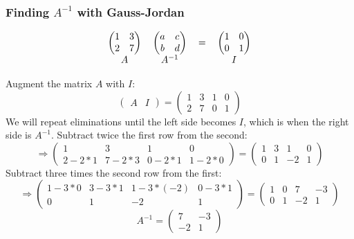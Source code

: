 \documentclass[12pt]{article}
\begin{document}
\subsubsection{Finding $A^{-1}$ with Gauss-Jordan}
\[ 
  \begin{tabular}{cccc}
    $\left(
        \begin{matrix}
            1 & 3\\
            2 & 7
        \end{matrix}
    \right)$ &
    $\left(
        \begin{matrix}
            a & c\\
            b & d
        \end{matrix}
    \right)$ &
    $=$ & 
    $\left(
        \begin{matrix}
            1 & 0\\
            0 & 1
        \end{matrix}
    \right)$\\
    $A$ & $A^{-1}$ & & $I$
  \end{tabular}
\]

Augment the matrix $A$ with $I$:
\[
\left(
    \begin{array}{c|c}
        A & I
    \end{array}
\right)
=
\left(
    \begin{array}{cc|cc}
        1 & 3 & 1 & 0\\ 
        2 & 7 & 0 & 1
    \end{array}
\right)
\]
We will repeat eliminations until the left side becomes $I$, which is when the right side is $A^{-1}$. Subtract twice the first row from the second:
\[
\Rightarrow
\left(
    \begin{array}{cc|cc}
        1 & 3 & 1 & 0\\ 
        2-2*1 & 7-2*3 & 0-2*1 & 1-2*0
    \end{array}
\right)
=
\left(
    \begin{array}{cc|cc}
        1 & 3 & 1 & 0\\ 
        0 & 1 & -2 & 1
    \end{array}
\right)
\]
Subtract three times the second row from the first:
\[
\Rightarrow
\left(
    \begin{array}{cc|cc}
        1-3*0 & 3-3*1 & 1-3*(-2) & 0-3*1\\ 
        0 & 1 & -2 & 1
    \end{array}
\right)
=
\left(
    \begin{array}{cc|cc}
        1 & 0 & 7 & -3\\ 
        0 & 1 & -2 & 1
    \end{array}
\right)
\]
\[
A^{-1}=
\left(
    \begin{matrix}
        7 & -3\\
        -2 & 1
    \end{matrix}
\right)
\]
\end{document}
